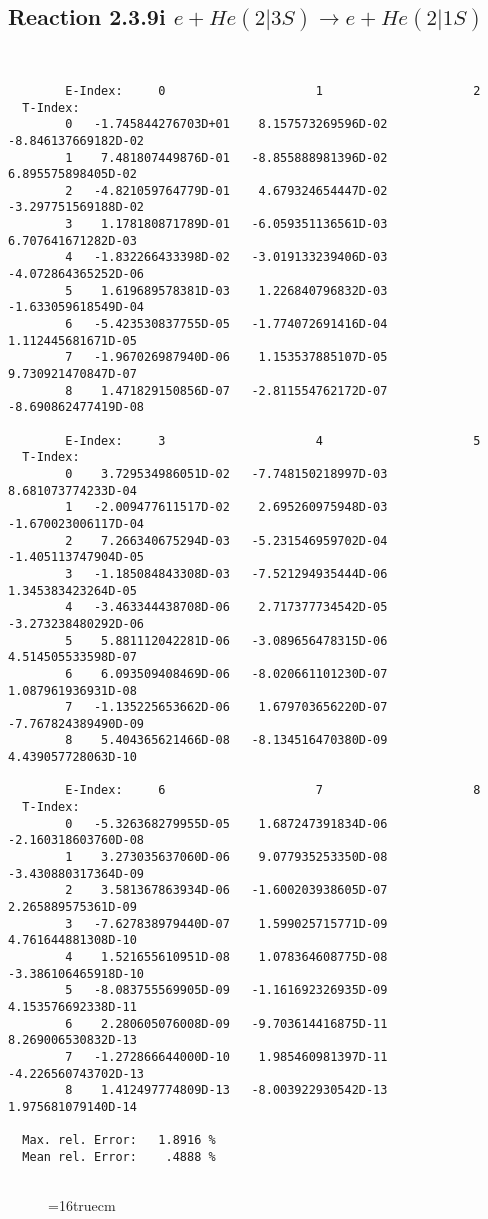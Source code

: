 \documentclass[12pt]{article}
\begin{document}
\subsection{
Reaction 2.3.9i $ e + He(2|3S) \rightarrow e + He(2|1S) $
}


\begin{small}\begin{verbatim}


        E-Index:     0                     1                     2
  T-Index:
        0   -1.745844276703D+01    8.157573269596D-02   -8.846137669182D-02
        1    7.481807449876D-01   -8.855888981396D-02    6.895575898405D-02
        2   -4.821059764779D-01    4.679324654447D-02   -3.297751569188D-02
        3    1.178180871789D-01   -6.059351136561D-03    6.707641671282D-03
        4   -1.832266433398D-02   -3.019133239406D-03   -4.072864365252D-06
        5    1.619689578381D-03    1.226840796832D-03   -1.633059618549D-04
        6   -5.423530837755D-05   -1.774072691416D-04    1.112445681671D-05
        7   -1.967026987940D-06    1.153537885107D-05    9.730921470847D-07
        8    1.471829150856D-07   -2.811554762172D-07   -8.690862477419D-08

        E-Index:     3                     4                     5
  T-Index:
        0    3.729534986051D-02   -7.748150218997D-03    8.681073774233D-04
        1   -2.009477611517D-02    2.695260975948D-03   -1.670023006117D-04
        2    7.266340675294D-03   -5.231546959702D-04   -1.405113747904D-05
        3   -1.185084843308D-03   -7.521294935444D-06    1.345383423264D-05
        4   -3.463344438708D-06    2.717377734542D-05   -3.273238480292D-06
        5    5.881112042281D-06   -3.089656478315D-06    4.514505533598D-07
        6    6.093509408469D-06   -8.020661101230D-07    1.087961936931D-08
        7   -1.135225653662D-06    1.679703656220D-07   -7.767824389490D-09
        8    5.404365621466D-08   -8.134516470380D-09    4.439057728063D-10

        E-Index:     6                     7                     8
  T-Index:
        0   -5.326368279955D-05    1.687247391834D-06   -2.160318603760D-08
        1    3.273035637060D-06    9.077935253350D-08   -3.430880317364D-09
        2    3.581367863934D-06   -1.600203938605D-07    2.265889575361D-09
        3   -7.627838979440D-07    1.599025715771D-09    4.761644881308D-10
        4    1.521655610951D-08    1.078364608775D-08   -3.386106465918D-10
        5   -8.083755569905D-09   -1.161692326935D-09    4.153576692338D-11
        6    2.280605076008D-09   -9.703614416875D-11    8.269006530832D-13
        7   -1.272866644000D-10    1.985460981397D-11   -4.226560743702D-13
        8    1.412497774809D-13   -8.003922930542D-13    1.975681079140D-14

  Max. rel. Error:   1.8916 %
  Mean rel. Error:    .4888 %


\end{verbatim}\end{small}
\begin{figure} \label{2.3.9i}
\epsfxsize=16truecm
\end{figure}
\newpage
\end{document}

